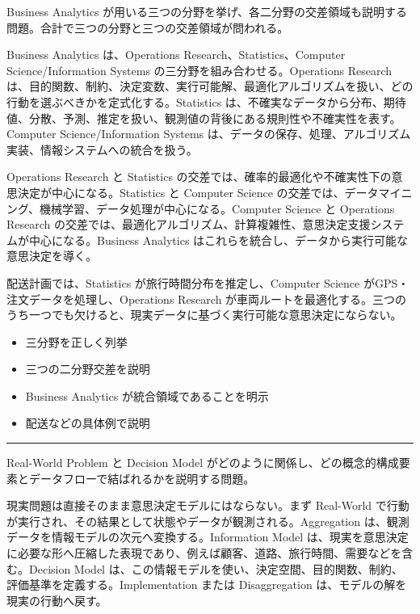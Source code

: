 \clearpage
{}
Business Analytics が用いる三つの分野を挙げ、各二分野の交差領域も説明する問題。合計で三つの分野と三つの交差領域が問われる。\par
{}
Business Analytics は、Operations Research、Statistics、Computer Science/Information Systems の三分野を組み合わせる。Operations Research は、目的関数、制約、決定変数、実行可能解、最適化アルゴリズムを扱い、どの行動を選ぶべきかを定式化する。Statistics は、不確実なデータから分布、期待値、分散、予測、推定を扱い、観測値の背後にある規則性や不確実性を表す。Computer Science/Information Systems は、データの保存、処理、アルゴリズム実装、情報システムへの統合を扱う。\par
Operations Research と Statistics の交差では、確率的最適化や不確実性下の意思決定が中心になる。Statistics と Computer Science の交差では、データマイニング、機械学習、データ処理が中心になる。Computer Science と Operations Research の交差では、最適化アルゴリズム、計算複雑性、意思決定支援システムが中心になる。Business Analytics はこれらを統合し、データから実行可能な意思決定を導く。\par
{}
配送計画では、Statistics が旅行時間分布を推定し、Computer Science がGPS・注文データを処理し、Operations Research が車両ルートを最適化する。三つのうち一つでも欠けると、現実データに基づく実行可能な意思決定にならない。\par
{}
\begin{itemize}
\item 三分野を正しく列挙
\item 三つの二分野交差を説明
\item Business Analytics が統合領域であることを明示
\item 配送などの具体例で説明
\end{itemize}
\vspace{2mm}\hrule\vspace{2mm}
Real-World Problem と Decision Model がどのように関係し、どの概念的構成要素とデータフローで結ばれるかを説明する問題。\par
{}
現実問題は直接そのまま意思決定モデルにはならない。まず Real-World で行動が実行され、その結果として状態やデータが観測される。Aggregation は、観測データを情報モデルの次元へ変換する。Information Model は、現実を意思決定に必要な形へ圧縮した表現であり、例えば顧客、道路、旅行時間、需要などを含む。Decision Model は、この情報モデルを使い、決定空間、目的関数、制約、評価基準を定義する。Implementation または Disaggregation は、モデルの解を現実の行動へ戻す。\par
